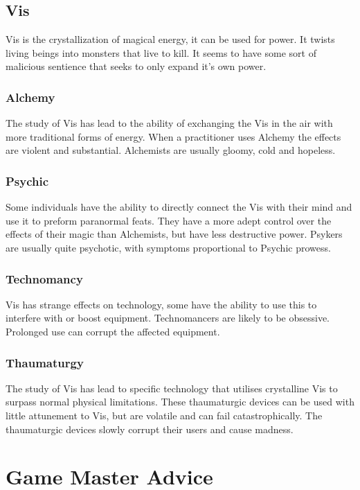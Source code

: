 \documentclass[a4paper,12pt,oneside]{book}
\begin{document}
        \section{Vis}
            Vis is the crystallization of magical energy, it can be used for power. It twists living beings into monsters that live to kill. It seems to have some sort of malicious sentience that seeks to only expand it's own power.

            \subsection{Alchemy}
                The study of Vis has lead to the ability of exchanging the Vis in the air with more traditional forms of energy. When a practitioner uses Alchemy the effects are violent and substantial. Alchemists are usually gloomy, cold and hopeless.

            \subsection{Psychic}
                Some individuals have the ability to directly connect the Vis with their mind and use it to preform paranormal feats. They have a more adept control over the effects of their magic than Alchemists, but have less destructive power. Psykers are usually quite psychotic, with symptoms proportional to Psychic prowess.

            \subsection{Technomancy}
                Vis has strange effects on technology, some have the ability to use this to interfere with or boost equipment. Technomancers are likely to be obsessive. Prolonged use can corrupt the affected equipment.

            \subsection{Thaumaturgy}
                The study of Vis has lead to specific technology that utilises crystalline Vis to surpass normal physical limitations. These thaumaturgic devices can be used with little attunement to Vis, but are volatile and can fail catastrophically. The thaumaturgic devices slowly corrupt their users and cause madness.

    \chapter{Game Master Advice}
\end{document}
